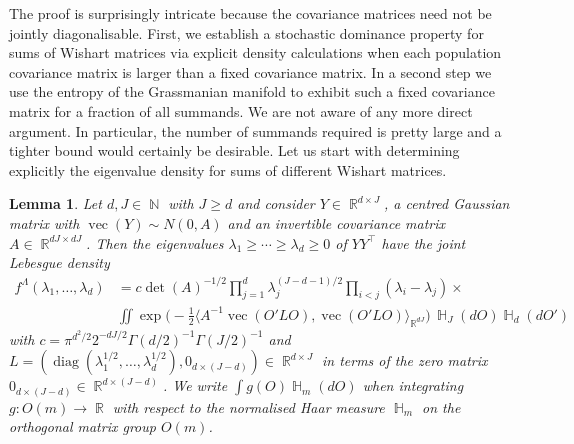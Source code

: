 \documentclass[preprint,aos]{imsart}
\numberwithin{equation}{section}
\newtheorem{lemma}[satz]{Lemma}
\theoremstyle{remark}
\DeclareMathOperator{\R}{{\mathbb R}}
\DeclareMathOperator{\N}{{\mathbb N}}
\DeclareMathOperator{\HH}{{\mathbb H}}
\DeclareMathOperator{\diag}{diag} \DeclareMathOperator{\KL}{KL}
\DeclareMathOperator{\vek}{vec}
\providecommand{\scapro}[2]{\langle #1,#2 \rangle}
\renewcommand{\ge}{\geqslant}
\begin{document}
\begin{appendix}
The proof is surprisingly intricate because the covariance matrices  need not be jointly diagonalisable. First, we establish a stochastic dominance property for sums of Wishart matrices via explicit density calculations when each population covariance matrix is larger than a fixed covariance matrix. In a second step we use the entropy of the Grassmanian manifold to exhibit such a fixed covariance matrix for a fraction of all summands. We are not aware of any more direct argument. In particular, the number of summands required is pretty large and a tighter bound would certainly be desirable.
Let us start with determining explicitly the eigenvalue density for sums of different Wishart matrices.

\begin{lemma}\label{LemWishartGen}
Let $d,J\in\N$ with $J\ge d$ and consider $Y\in\R^{d\times J}$, a centred Gaussian matrix with $\vek(Y)\sim N(0,A)$ and an invertible covariance matrix $A\in\R^{dJ\times dJ}$. Then the eigenvalues $\lambda_1\ge\cdots\ge \lambda_d\ge 0$ of $YY^\top$ have  the joint Lebesgue density
\begin{align*}
f^\Lambda(\lambda_1,\ldots,\lambda_{d})&=c\det(A)^{-1/2}\prod_{j=1}^{d}\lambda_j^{(J-d-1)/2}\prod_{i<j}(\lambda_i-\lambda_j)\times\\
&
\iint \exp\Big(-\frac12\scapro{A^{-1}\vek(O' L O)}{\vek(O'LO)}_{\R^{dJ}}\Big)\,\HH_J(dO)\HH_d(dO')
\end{align*}
with $c=\pi^{d^2/2}2^{-dJ/2}\Gamma(d/2)^{-1}\Gamma(J/2)^{-1}$ and $L=(\diag(\lambda_1^{1/2},\ldots,\lambda_{d}^{1/2}),0_{d\times (J-d)})\in\R^{d\times J}$ in terms of the zero matrix $0_{d\times (J-d)}\in\R^{d\times(J-d)}$. We write $\int g(O)\HH_m(dO)$ when integrating $g:O(m)\to\R$ with respect to the normalised Haar measure $\HH_m$ on the orthogonal matrix group $O(m)$.
\end{lemma}


\end{appendix}
\end{document}
